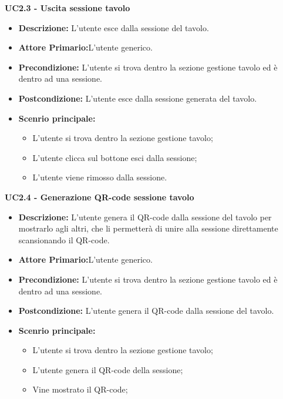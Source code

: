 \textbf{UC2.3 - Uscita sessione tavolo}
\begin{itemize}
    \item \textbf{Descrizione:} L'utente esce dalla sessione del tavolo.
    \item \textbf{Attore Primario:}L'utente generico.
    \item \textbf{Precondizione:} L'utente si trova dentro la sezione gestione tavolo ed è dentro ad una sessione.
    \item \textbf{Postcondizione:} L'utente esce dalla sessione generata del tavolo.
    \item \textbf{Scenrio principale:}
    \begin{itemize}
        \item L'utente si trova dentro la sezione gestione tavolo;
        \item L'utente clicca sul bottone esci dalla sessione;
        \item L'utente viene rimosso dalla sessione.
    \end{itemize}
\end{itemize}
\textbf{UC2.4 - Generazione QR-code sessione tavolo}
\begin{itemize}
    \item \textbf{Descrizione:} L'utente genera il QR-code dalla sessione del tavolo per mostrarlo agli altri, che li permetterà di unire alla sessione direttamente scansionando il QR-code.
    \item \textbf{Attore Primario:}L'utente generico.
    \item \textbf{Precondizione:} L'utente si trova dentro la sezione gestione tavolo ed è dentro ad una sessione.
    \item \textbf{Postcondizione:} L'utente genera il QR-code dalla sessione del tavolo.
    \item \textbf{Scenrio principale:}
    \begin{itemize}
        \item L'utente si trova dentro la sezione gestione tavolo;
        \item L'utente genera il QR-code della sessione;
        \item Vine mostrato il QR-code;
    \end{itemize}
\end{itemize}




